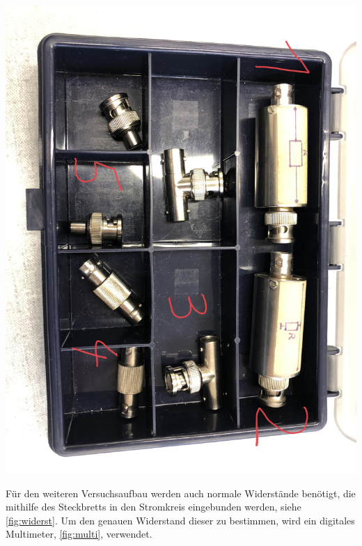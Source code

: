 \documentclass[11pt,ngerman]{scrartcl}
\begin{document}
\begin{minipage}{\textwidth}
\begin{minipage}[t]{0.50\textwidth}
		\includegraphics[angle = 90,width=\textwidth]{kleines}
		\label{fig:klein}
	\end{minipage}
	\vspace{1em}
\end{minipage}

\noindent Für den weiteren Versuchsaufbau werden auch normale Widerstände benötigt, die mithilfe des Steckbretts in den Stromkreis eingebunden werden, siehe \autoref{fig:widerst}. Um den genauen Widerstand dieser zu bestimmen, wird ein digitales Multimeter, \autoref{fig:multi}, verwendet.
\end{document}
